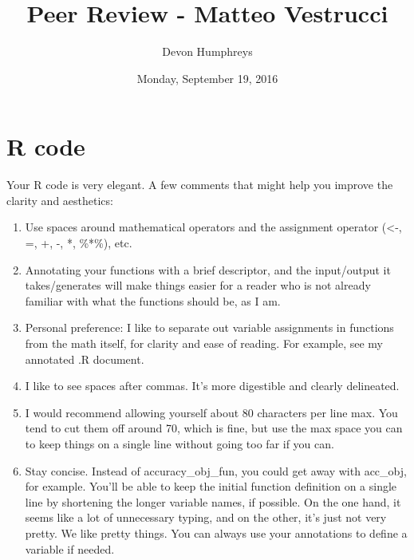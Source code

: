 \documentclass[12pt, oneside]{article}   	%
\title{Peer Review - Matteo Vestrucci}
\author{Devon Humphreys}
\date{Monday, September 19, 2016}							%
\begin{document}
\maketitle




\section{R code}
Your R code is very elegant. A few comments that might help you improve the clarity and aesthetics: 
\begin{enumerate}
\item Use spaces around mathematical operators and the assignment operator (\textless-, =, +, -, *, \%*\%), etc. 
\item Annotating your functions with a brief descriptor, and the input/output it takes/generates will make things easier for a reader who is not already familiar with what the functions should be, as I am. 
\item Personal preference: I like to separate out variable assignments in functions from the math itself, for clarity and ease of reading. For example, see my annotated .R document.
\item I like to see spaces after commas. It's more digestible and clearly delineated.
\item I would recommend allowing yourself about 80 characters per line max. You tend to cut them off around 70, which is fine, but use the max space you can to keep things on a single line without going too far if you can.
\item Stay concise. Instead of accuracy\_obj\_fun, you could get away with acc\_obj, for example. You'll be able to keep the initial function definition on a single line by shortening the longer variable names, if possible. On the one hand, it seems like a lot of unnecessary typing, and on the other, it's just not very pretty. We like pretty things. You can always use your annotations to define a variable if needed.

\end{enumerate}
\end{document}
